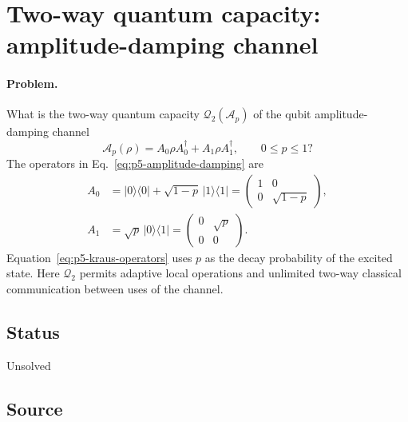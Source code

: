 \section{Two-way quantum capacity: amplitude-damping channel}
\label{sec:op_e490c9462b37a548}

\paragraph{Problem.}
What is the two-way quantum capacity $\mathcal{Q}_2(\mathcal A_p)$ of the
qubit amplitude-damping channel
\begin{equation}
  \mathcal A_p(\rho)=A_0\rho A_0^\dagger+A_1\rho A_1^\dagger,
  \qquad 0\le p\le1?
  \label{eq:p5-amplitude-damping}
\end{equation}
The operators in Eq.~\eqref{eq:p5-amplitude-damping} are
\begin{equation}
  \begin{aligned}
    A_0&=\lvert0\rangle\!\langle0\rvert
         +\sqrt{1-p}\,\lvert1\rangle\!\langle1\rvert
       =\begin{pmatrix}1&0\\0&\sqrt{1-p}\end{pmatrix},\\
    A_1&=\sqrt p\,\lvert0\rangle\!\langle1\rvert
       =\begin{pmatrix}0&\sqrt p\\0&0\end{pmatrix}.
  \end{aligned}
  \label{eq:p5-kraus-operators}
\end{equation}
Equation~\eqref{eq:p5-kraus-operators} uses $p$ as the decay probability of
the excited state.  Here $\mathcal{Q}_2$ permits adaptive local operations and
unlimited two-way classical communication between uses of the channel.

\subsection*{Status}

Unsolved

\subsection*{Source}

